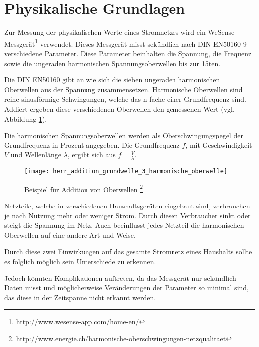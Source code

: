 \section{Physikalische Grundlagen} \label{physikalischeGrundlagen}
    Zur Messung der physikalischen Werte eines Stromnetzes wird ein WeSense-Messgerät\footnote{http://www.wesense-app.com/home-en/} verwendet.
    Dieses Messgerät misst sekündlich nach DIN EN50160\cite{WesenseManual} 9 verschiedene Parameter.
    Diese Parameter beinhalten die Spannung, die Frequenz sowie die ungeraden harmonischen Spannungsoberwellen bis zur 15ten\cite[S.2, Kapitel 1.2]{WesenseManual}.
    \newline

    Die DIN EN50160\cite{EN50160} gibt an wie sich die sieben ungeraden harmonischen Oberwellen aus der Spannung zusammensetzen.
    Harmonische Oberwellen sind reine sinusförmige Schwingungen, welche das n-fache einer Grundfrequenz sind.
    Addiert ergeben diese verschiedenen Oberwellen den gemessenen Wert (vgl. Abbildung \ref{fig:AddierteOberwwellen}).

    Die harmonischen Spannungsoberwellen werden als Oberschwingungspegel der Grundfrequenz in Prozent angegeben.
    Die Grundfrequenz \( f \), mit Geschwindigkeit \( V \) und Wellenlänge \( \lambda \), ergibt sich aus \( f = \frac{V}{\lambda} \).

    \begin{figure}[H]
        \centering
        \texttt{[image: herr\_addition\_grundwelle\_3\_harmonische\_oberwelle]}
        \caption[Addition von Oberwellen]{Beispiel für Addition von Oberwellen \footnote{\url{http://www.energie.ch/harmonische-oberschwingungen-netzqualitaet}} }
        \label{fig:AddierteOberwwellen}
    \end{figure}

    Netzteile, welche in verschiedenen Haushaltsgeräten eingebaut sind, verbrauchen je nach Nutzung mehr oder weniger Strom.
    Durch diesen Verbraucher sinkt oder steigt die Spannung im Netz.
    Auch beeinflusst jedes Netzteil die harmonischen Oberwellen auf eine andere Art und Weise.
    
    Durch diese zwei Einwirkungen auf das gesamte Stromnetz eines Haushalts sollte es folglich möglich sein Unterschiede zu erkennen.
    
    Jedoch könnten Komplikationen auftreten, da das Messgerät nur sekündlich Daten misst und möglicherweise Veränderungen der Parameter so minimal sind, das diese in der Zeitspanne nicht erkannt werden. 

